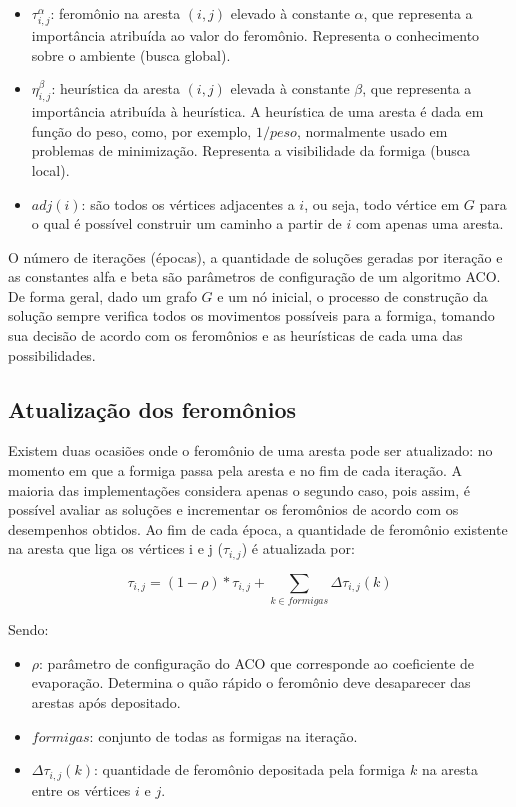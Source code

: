 \begin{itemize}  
	\item $\tau_{i,j}^\alpha$: feromônio na aresta $(i,j)$ elevado à constante $\alpha$, que representa a importância atribuída ao valor do feromônio. Representa o conhecimento sobre o ambiente (busca global).
	\item $\eta_{i,j}^\beta$: heurística da aresta $(i,j)$ elevada à constante $\beta$, que representa a importância atribuída à heurística. A heurística de uma aresta é dada em função do peso, como, por exemplo, $1/peso$, normalmente usado em problemas de minimização. Representa a visibilidade da formiga (busca local).
	\item $adj(i)$: são todos os vértices adjacentes a $i$, ou seja, todo vértice em $G$ para o qual é possível construir um caminho a partir de $i$ com apenas uma aresta.
\end{itemize}

O número de iterações (épocas), a quantidade de soluções geradas por iteração e as constantes alfa e beta são parâmetros de configuração de um algoritmo ACO. De forma geral, dado um grafo $G$ e um nó inicial, o processo de construção da solução sempre verifica todos os movimentos possíveis para a formiga, tomando sua decisão de acordo com os feromônios e as heurísticas de cada uma das possibilidades.

\subsection{Atualização dos feromônios}
Existem duas ocasiões onde o feromônio de uma aresta pode ser atualizado: no momento em que a formiga passa pela aresta e no fim de cada iteração. A maioria das implementações considera apenas o segundo caso, pois assim, é possível avaliar as soluções e incrementar os feromônios de acordo com os desempenhos obtidos. Ao fim de cada época, a quantidade de feromônio existente na aresta que liga os vértices i e j ($\tau_{i,j}$) é atualizada por:

\begin{equation}\tau_{i,j} = (1 - \rho) * \tau_{i,j} + \sum_{k \in formigas} \Delta\tau_{i,j}(k)\end{equation}

Sendo:

\begin{itemize}  
	\item $\rho$: parâmetro de configuração do ACO que corresponde ao coeficiente de evaporação. Determina o quão rápido o feromônio deve desaparecer das arestas após depositado.
	\item $formigas$: conjunto de todas as formigas na iteração.
	\item $\Delta\tau_{i,j}(k)$: quantidade de feromônio depositada pela formiga $k$ na aresta entre os vértices $i$ e $j$.
\end{itemize}

